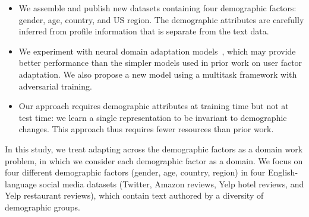 \begin{itemize}
\item We assemble and publish new datasets containing four demographic factors: gender, age, country, and US region. The demographic attributes are carefully inferred from profile information that is separate from the text data.
\item We experiment with neural domain adaptation models~\cite{ganin2016domain}, which may provide better performance than the simpler models used in prior work on user factor adaptation.
We also propose a new model using a multitask framework with adversarial training.
\item Our approach requires demographic attributes at training time but not at test time: we learn a single representation to be invariant to demographic changes.
This approach thus requires fewer resources than prior work.
\end{itemize}

In this study, we treat adapting across the demographic factors as a domain work problem, in which we consider each demographic factor as a domain. We focus on four different demographic factors (gender, age, country, region) in four English-language social media datasets (Twitter, Amazon reviews, Yelp hotel reviews, and Yelp restaurant reviews), which contain text authored by a diversity of demographic groups.

%
%

